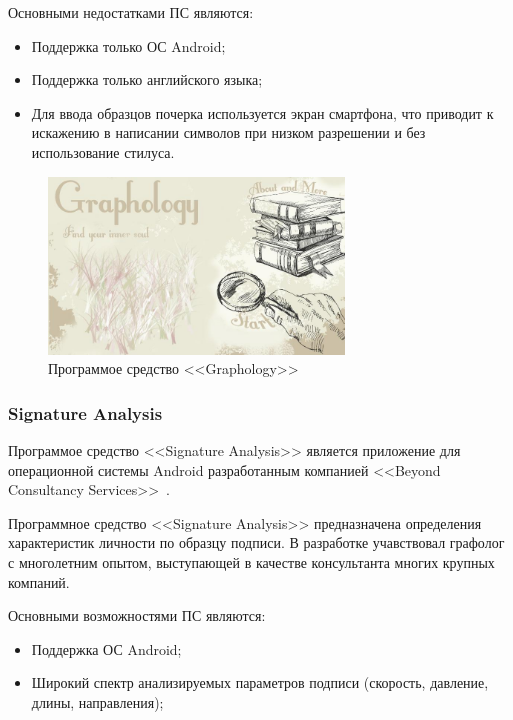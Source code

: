Основными недостатками ПС являются:
\begin{itemize}
  \item Поддержка только ОС Android;
  \item Поддержка только английского языка;
  \item Для ввода образцов почерка используется экран смартфона, что приводит к искажению в написании символов при низком разрешении и без использование стилуса.
\end{itemize}

\begin{figure}[ht]
    \centering
    \label{fig:domain:analogs:graphology}
    \includegraphics[width=0.7\textwidth]{figures/graphology_analog.jpeg}
    \caption{Программое средство <<Graphology>>}
\end{figure}

\subsubsection{Signature Analysis}
\label{sub:domain:analogs:signature_analysis} 

Программое средство <<Signature Analysis>> является приложение для операционной системы Android разработанным компанией <<Beyond Consultancy Services>>~\cite{analogs_signature_analysis}.

Программное средство <<Signature Analysis>> предназначена определения характеристик личности по образцу подписи. В разработке учавствовал графолог с многолетним опытом, выступающей в качестве консультанта многих крупных компаний.

Основными возможностями ПС являются:
\begin{itemize}
  \item Поддержка ОС Android;
  \item Широкий спектр анализируемых параметров подписи (скорость, давление, длины, направления);
\end{itemize}

